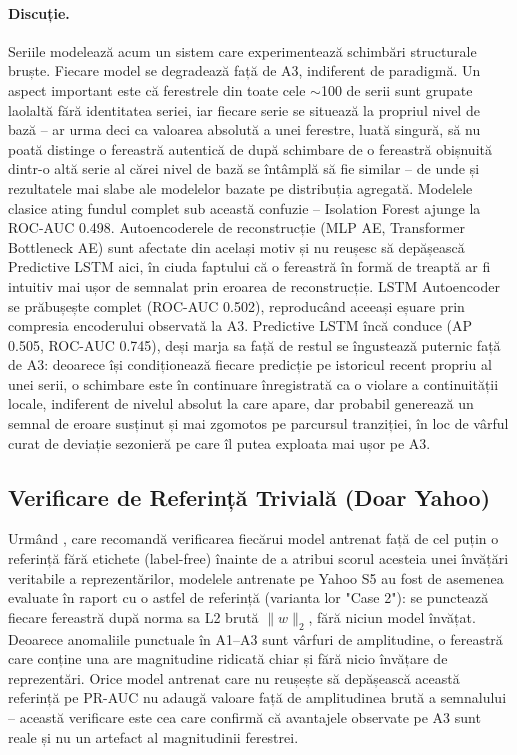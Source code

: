 \paragraph{Discuție.} Seriile modelează acum un sistem care experimentează schimbări structurale bruște.
Fiecare model se degradează față de A3, indiferent de paradigmă. Un aspect important este că ferestrele din toate cele $\sim$100 de serii sunt grupate laolaltă fără identitatea seriei, iar fiecare serie se situează la propriul nivel de bază -- ar urma deci ca valoarea absolută a unei ferestre, luată singură, să nu poată distinge o fereastră autentică de după schimbare de o fereastră obișnuită dintr-o altă serie al cărei nivel de bază se întâmplă să fie similar -- de unde și rezultatele mai slabe ale modelelor bazate pe distribuția agregată. 
Modelele clasice ating fundul complet sub această confuzie -- Isolation Forest ajunge la ROC-AUC 0.498. Autoencoderele de reconstrucție (MLP AE, Transformer Bottleneck AE) sunt afectate din același motiv și nu reușesc să depășească Predictive LSTM aici, în ciuda faptului că o fereastră în formă de treaptă ar fi intuitiv mai ușor de semnalat prin eroarea de reconstrucție. LSTM Autoencoder se prăbușește complet (ROC-AUC 0.502), reproducând aceeași eșuare prin compresia encoderului observată la A3. 
Predictive LSTM încă conduce (AP 0.505, ROC-AUC 0.745), deși marja sa față de restul se îngustează puternic față de A3: deoarece își condiționează fiecare predicție pe istoricul recent propriu al unei serii, o schimbare este în continuare înregistrată ca o violare a continuității locale, indiferent de nivelul absolut la care apare, dar probabil generează un semnal de eroare susținut și mai zgomotos pe parcursul tranziției, în loc de vârful curat de deviație sezonieră pe care îl putea exploata mai ușor pe A3.

\subsection{Verificare de Referință Trivială (Doar Yahoo)}

Urmând \textcite{kim2022rigorous}, care recomandă verificarea fiecărui model antrenat față de cel puțin o referință fără etichete (label-free) înainte de a atribui scorul acesteia unei învățări veritabile a reprezentărilor, modelele antrenate pe Yahoo S5 au fost de asemenea evaluate în raport cu o astfel de referință (varianta lor "Case 2"): se punctează fiecare fereastră după norma sa L2 brută $\lVert w \rVert_2$, fără niciun model învățat. Deoarece anomaliile punctuale în A1--A3 sunt vârfuri de amplitudine, o fereastră care conține una are magnitudine ridicată chiar și fără nicio învățare de reprezentări.
Orice model antrenat care nu reușește să depășească această referință pe PR-AUC nu adaugă valoare față de amplitudinea brută a semnalului -- această verificare este cea care confirmă că avantajele observate pe A3 sunt reale și nu un artefact al magnitudinii ferestrei.

